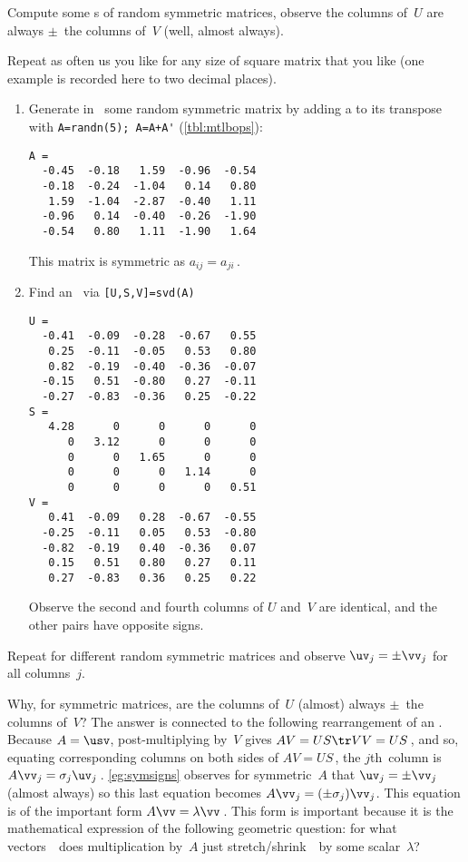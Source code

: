 \begin{example} \label{eg:symsigns}
Compute some \svd{}s of random symmetric matrices, observe the columns of~\(U\) are always \(\pm\)~the columns of~\(V\) (well, almost always).
\begin{solution} 
Repeat as often us you like for any size of square matrix that you like  (one example is recorded here to two decimal places).  
\begin{enumerate}
\item Generate in \script\ some random symmetric matrix by adding a  to its transpose with \verb|A=randn(5); A=A+A'| (\autoref{tbl:mtlbops}):
\setbox\ajrqrbox\hbox{}%
\marginpar{\usebox{\ajrqrbox\\[2ex]}}%
\begin{verbatim}
A =
  -0.45  -0.18   1.59  -0.96  -0.54
  -0.18  -0.24  -1.04   0.14   0.80
   1.59  -1.04  -2.87  -0.40   1.11
  -0.96   0.14  -0.40  -0.26  -1.90
  -0.54   0.80   1.11  -1.90   1.64
\end{verbatim}
This matrix is symmetric as \(a_{ij}=a_{ji}\)\,.
\item Find an \svd\ via \verb|[U,S,V]=svd(A)|
\begin{verbatim}
U =
  -0.41  -0.09  -0.28  -0.67   0.55
   0.25  -0.11  -0.05   0.53   0.80
   0.82  -0.19  -0.40  -0.36  -0.07
  -0.15   0.51  -0.80   0.27  -0.11
  -0.27  -0.83  -0.36   0.25  -0.22
S =
   4.28      0      0      0      0
      0   3.12      0      0      0
      0      0   1.65      0      0
      0      0      0   1.14      0
      0      0      0      0   0.51
V =
   0.41  -0.09   0.28  -0.67  -0.55
  -0.25  -0.11   0.05   0.53  -0.80
  -0.82  -0.19   0.40  -0.36   0.07
   0.15   0.51   0.80   0.27   0.11
   0.27  -0.83   0.36   0.25   0.22
\end{verbatim}
Observe the second and fourth columns of \(U\) and~\(V\) are identical, and the other pairs have opposite signs.
\end{enumerate}
Repeat for different random symmetric matrices and observe \(\uv_j=\pm \vv_j\) for all columns~\(j\).
\end{solution}
\end{example}

Why, for symmetric matrices, are the columns of~\(U\) (almost) always \(\pm\)~the columns of~\(V\)?
The answer is connected to the following rearrangement of an \svd.  
Because \(A=\usv\), post-multiplying by~\(V\) gives \(AV=US\tr VV=US\)\,, and so, equating corresponding columns on both sides of \(AV=US\)\,, the \(j\)th~column is \(A\vv_j=\sigma_j\uv_j\)\,.
\autoref{eg:symsigns} observes for symmetric~\(A\) that \(\uv_j=\pm\vv_j\) (almost always) so this last equation becomes \(A\vv_j=(\pm \sigma_j)\vv_j\).
This equation is of the important form \(A\vv=\lambda\vv\)\,.
This form is important because it is the mathematical expression of the following geometric question: for what vectors~\vv\ does multiplication by~\(A\) just stretch\slash shrink~\vv\ by some scalar~\(\lambda\)?

